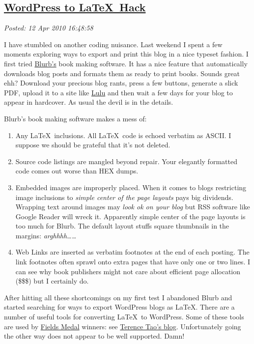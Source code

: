%

\subsection*{\href{https://bakerjd99.wordpress.com/2010/04/12/wordpress-to-latex-hack/}{WordPress to \LaTeX\ Hack}}


\noindent\emph{Posted: 12 Apr 2010 16:48:58}
\vspace{6pt}

I have stumbled on another coding nuisance. Last weekend I spent a few
moments exploring ways to export and print this blog in a nice typeset
fashion. I first tried
\href{http://www.blurb.com/?ce=google\_brand\_blurb\&gclid=CPWP3fHHgaECFQhinAodnw-Twg}{Blurb's}
book making software. It has a nice feature that automatically downloads
blog posts and formats them as ready to print books. Sounds great ehh?
Download your precious blog rants, press a few buttons, generate a slick
PDF, upload it to a site like \href{http://www.lulu.com/}{Lulu} and then
wait a few days for your blog to appear in hardcover. As usual the devil
is in the details.

Blurb's book making software makes a mess of:

\begin{enumerate}
\item
  Any \LaTeX\ inclusions. All \LaTeX\ code is echoed
  verbatim as ASCII. I suppose we should be grateful that it's not
  deleted.
\item
  Source code listings are mangled beyond repair. Your elegantly
  formatted code comes out worse than HEX dumps.
\item
  Embedded images are improperly placed. When it comes to blogs
  restricting image inclusions to \emph{simple center of the page
  layouts} pays big dividends. Wrapping text around images may
  \emph{look ok on your blog} but RSS software like Google Reader will
  wreck it. Apparently simple center of the page layouts is too much for
  Blurb. The default layout stuffs square thumbnails in the margins:
  \emph{arghhhh\ldots{}\ldots{}}
\item
  Web Links are inserted as verbatim footnotes at the end of each
  posting. The link footnotes often sprawl onto extra pages that have
  only one or two lines. I can see why book publishers might not care
  about efficient page allocation (\$\$\$) but I certainly do.
\end{enumerate}
After hitting all these shortcomings on my first test I abandoned Blurb
and started searching for ways to export WordPress blogs as
\LaTeX. There are a number of useful tools for converting
\LaTeX\ to WordPress. Some of these tools are used by
\href{http://mathworld.wolfram.com/FieldsMedal.html}{Fields Medal}
winners: see \href{http://terrytao.wordpress.com/}{Terence Tao's blog}.
Unfortunately going the other way does not appear to be well supported.
Damn!

